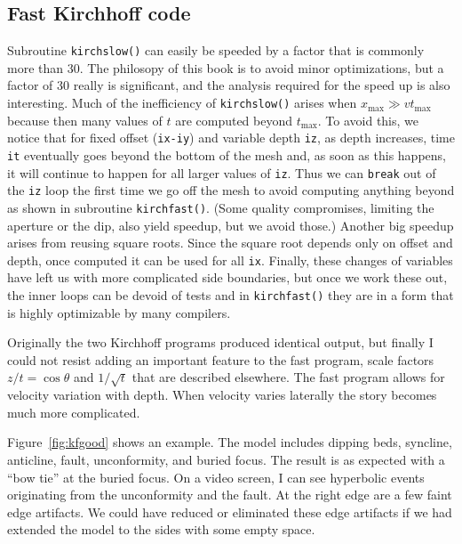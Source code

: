 \subsection{Fast Kirchhoff code}
\par
Subroutine {\tt kirchslow()} can easily be speeded by a factor
that is commonly more than 30.
The philosopy of this book is to avoid minor optimizations,
but a factor of 30 really is significant,
and the analysis required for the speed up is also interesting.
Much of the inefficiency of {\tt kirchslow()} arises when
$x_{\max} \gg v t_{\max}$ because then many values of $t$
are computed beyond $t_{\max}$.
To avoid this,
we notice that for fixed offset ({\tt ix-iy}) and variable depth {\tt iz},
as depth increases,
time {\tt it} eventually goes beyond the bottom of the mesh
and, as soon as this happens,
it will continue to happen for all larger values of {\tt iz}.
Thus we can {\tt break} out of the {\tt iz} loop the first time
we go off the mesh to avoid computing anything beyond
as shown in subroutine {\tt kirchfast()}.
(Some quality compromises, limiting the aperture or the dip,
also yield speedup, but we avoid those.)
Another big speedup arises from reusing square roots.
Since the square root depends only on offset and depth,
once computed it can be used for all {\tt ix}.
Finally, these changes of variables have left us
with more complicated side boundaries,
but once we work these out,
the inner loops can be devoid of tests and
in {\tt kirchfast()}
they are in a form that is highly optimizable by many compilers.%

\par
Originally the two Kirchhoff programs produced identical output,
but finally I could not resist adding an important feature
to the fast program,
scale factors $z/t=\cos\theta$
and $1/\sqrt{t}$ that are described elsewhere.
The fast program
allows for velocity variation with depth.
When velocity varies laterally the story becomes much more complicated.

\par
Figure~\ref{fig:kfgood} shows an example.
The model includes dipping beds, syncline, anticline, fault,
unconformity, and buried focus.
The result is as expected with a ``bow tie'' at the buried focus.
On a video screen, I can see hyperbolic events originating
from the unconformity and the fault.
At the right edge are a few faint edge artifacts.
We could have reduced or eliminated these edge artifacts
if we had extended the model to the sides with some empty space.

